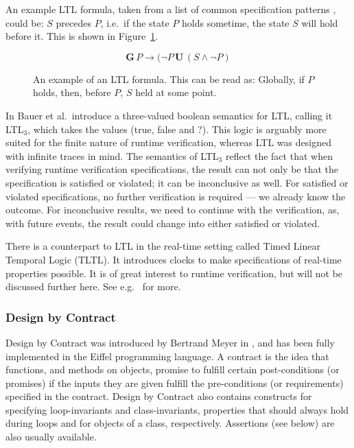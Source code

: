 \documentclass[a4paper,11pt]{kth-mag}
\begin{document}
An example LTL formula, taken from a list of common specification patterns
\cite{dwyer99patterns}, could be: $S$ precedes $P$, i.e.\ if the state $P$
holds sometime, the state $S$ will hold before it. This is shown in
Figure~\ref{figure-ltl}.

\begin{figure}[h!]
	\[
	\boldsymbol{G} \, P \rightarrow (\neg P \, \boldsymbol{U} \, (S \wedge \neg P)
	\]

	\caption{An example of an LTL formula. This can be read as: Globally, if $P$
	holds, then, before $P$, $S$ held at some point.}
	\label{figure-ltl}
\end{figure}

In \cite{bauer06monitoring} Bauer et al.\ introduce a three-valued boolean
semantics for LTL, calling it LTL$_3$, which takes the values (true, false and
?). This logic is arguably more suited for the finite nature of runtime
verification, whereas LTL was designed with infinite traces in mind. The
semantics of LTL$_3$ reflect the fact that when verifying runtime verification
specifications, the result can not only be that the specification is satisfied
or violated; it can be inconclusive as well. For satisfied or violated
specifications, no further verification is required --- we already know the
outcome. For inconclusive results, we need to continue with the verification,
as, with future events, the result could change into either satisfied or
violated.

There is a counterpart to LTL in the real-time setting called Timed Linear
Temporal Logic (TLTL). It introduces clocks to make specifications
of real-time properties possible. It is of great interest to runtime
verification, but will not be discussed further here. See e.g.\
\cite{bauer06monitoring} for more.


\subsubsection{Design by Contract}

Design by Contract was introduced by Bertrand Meyer in
\cite{meyer92applyingdbc}, and has been fully implemented in the Eiffel
programming language. A contract is the idea that functions, and methods on
objects, promise to fulfill certain post-conditions (or promises) if the inputs
they are given fulfill the pre-conditions (or requirements) specified in the
contract.  Design by Contract also contains constructs for specifying
loop-invariants and class-invariants, properties that should always hold during
loops and for objects of a class, respectively. Assertions (see below) are also
usually available.
\end{document}
